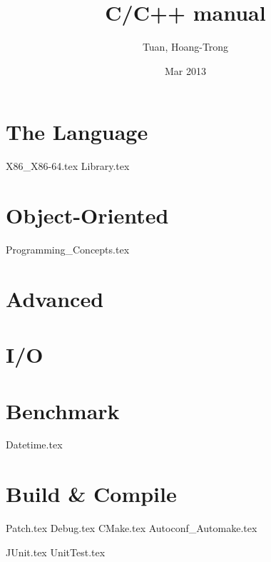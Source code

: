 \documentclass[11pt]{book}
\begin{document}
\author{Tuan, Hoang-Trong}
\title{C/C++ manual}
\date{Mar 2013}

\frontmatter
\tableofcontents
%

\mainmatter
{}



\part{The Language}


{X86_X86-64.tex}
{Library.tex}









\part{Object-Oriented}
{Programming_Concepts.tex}
 




\part{Advanced}





\part{I/O}
 


  


%  
% 
% 
% 
% 
% 
% 
% 
\part{Benchmark}
{Datetime.tex}
 



\part{Build \& Compile}

%


{Patch.tex} 
{Debug.tex}
{CMake.tex}
{Autoconf_Automake.tex}

{JUnit.tex}
{UnitTest.tex}
\end{document}
